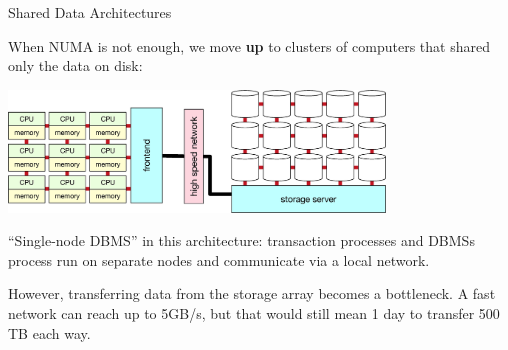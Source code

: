 

\begin{frame}{Shared Data Architectures}

When NUMA is not enough, we \alert{move \textbf{up}} to clusters of computers that shared only the data on disk:

\begin{center}
\includegraphics[width=0.75\textwidth]{figures/shared_disk_SAN.eps}
\end{center}

``Single-node DBMS'' in this architecture: transaction processes and DBMSs process run on separate nodes and communicate via a local network.

However, transferring data from the storage array becomes a bottleneck. A fast network can reach up to 5GB/s, but that would still mean 1 day to transfer 500 TB each way.

\end{frame}

